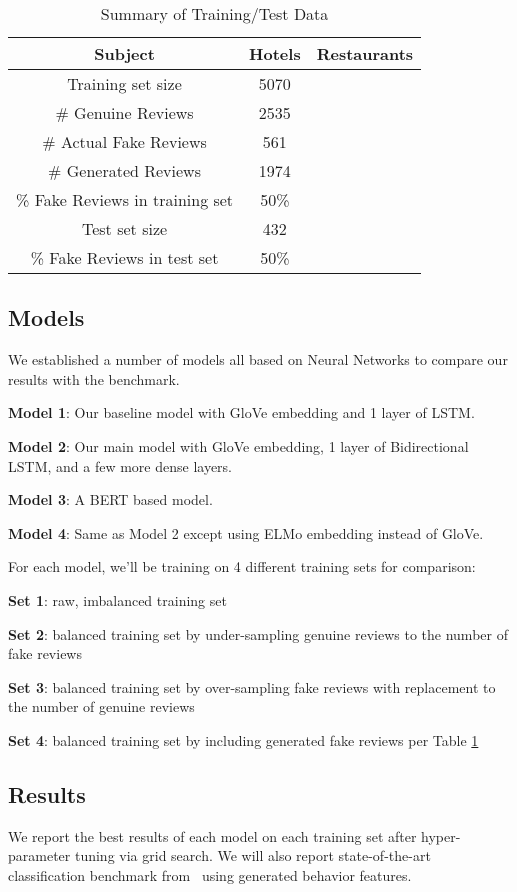 \documentclass[conference]{IEEEtran} %
\theoremstyle{plain}
\theoremstyle{definition}
\begin{document}
\begin{table}[h]
\normalsize
\caption{Summary of Training/Test Data}
\centering
\begin{tabular}{|c|c|c|}
\hline
Subject & Hotels & Restaurants \\ \hline
Training set size & 5070 &  \\ \hline
\# Genuine Reviews & 2535  &  \\ \hline
\# Actual Fake Reviews & 561  &  \\ \hline
\# Generated Reviews & 1974 &  \\ \hline
\% Fake Reviews in training set & 50\% &  \\ \hline
Test set size & 432 &  \\ \hline
\% Fake Reviews in test set & 50\% &  \\ 
\hline
\end{tabular}
\label{trainining-data}

\end{table}

\subsection{Models}
We established a number of models all based on Neural Networks to compare our results with the benchmark.

\textbf{Model 1}: Our baseline model with GloVe embedding and 1 layer of LSTM.

\textbf{Model 2}: Our main model with GloVe embedding, 1 layer of Bidirectional LSTM, and a few more dense layers.

\textbf{Model 3}: A BERT based model.

\textbf{Model 4}: Same as Model 2 except using ELMo embedding instead of GloVe.


For each model, we'll be training on 4 different training sets for comparison:

 \textbf{Set 1}: raw, imbalanced training set
 
 \textbf{Set 2}: balanced training set by under-sampling genuine reviews to the number of fake reviews
 
 \textbf{Set 3}: balanced training set by over-sampling fake reviews with replacement to the number of genuine reviews
 
 \textbf{Set 4}: balanced training set by including generated fake reviews per Table \ref{trainining-data}

\subsection{Results}
We report the best results of each model on each training set after hyper-parameter tuning via grid search. We will also report state-of-the-art classification benchmark from~\cite{Tang2020} using generated behavior features.
\end{document}
